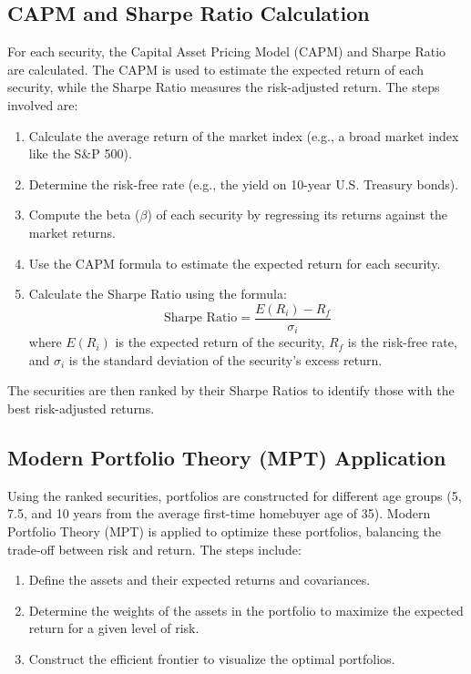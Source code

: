 \subsection{CAPM and Sharpe Ratio Calculation}
For each security, the Capital Asset Pricing Model (CAPM) and Sharpe Ratio are calculated. The CAPM is used to estimate the expected return of each security, while the Sharpe Ratio measures the risk-adjusted return. The steps involved are:
\begin{enumerate}
    \item Calculate the average return of the market index (e.g., a broad market index like the S\&P 500).
    \item Determine the risk-free rate (e.g., the yield on 10-year U.S. Treasury bonds).
    \item Compute the beta ($\beta$) of each security by regressing its returns against the market returns.
    \item Use the CAPM formula to estimate the expected return for each security.
    \item Calculate the Sharpe Ratio using the formula:
    \begin{equation}
        \text{Sharpe Ratio} = \frac{E(R_i) - R_f}{\sigma_i}
    \end{equation}
    where $E(R_i)$ is the expected return of the security, $R_f$ is the risk-free rate, and $\sigma_i$ is the standard deviation of the security’s excess return.
\end{enumerate}

The securities are then ranked by their Sharpe Ratios to identify those with the best risk-adjusted returns.

\subsection{Modern Portfolio Theory (MPT) Application}
Using the ranked securities, portfolios are constructed for different age groups (5, 7.5, and 10 years from the average first-time homebuyer age of 35). Modern Portfolio Theory (MPT) is applied to optimize these portfolios, balancing the trade-off between risk and return. The steps include:
\begin{enumerate}
    \item Define the assets and their expected returns and covariances.
    \item Determine the weights of the assets in the portfolio to maximize the expected return for a given level of risk.
    \item Construct the efficient frontier to visualize the optimal portfolios.
\end{enumerate}

